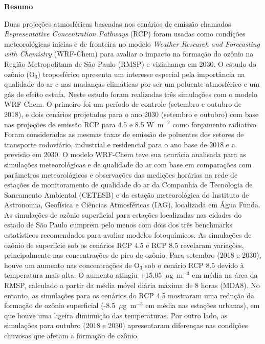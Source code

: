 \begin{spacing}{1.5}
		\begin{center}
			\LARGE \textbf{Resumo}\\[2cm]
		\end{center}
			Duas proje\c{c}\~{o}es atmosf\'{e}ricas baseadas nos cenários de emiss\~{a}o chamados \textit{Representative Concentration Pathways} (RCP) foram usadas como condições meteorol\'{o}gicas inicias e de fronteira no modelo \textit{Weather Research and Forecasting with Chemistry} (WRF-Chem) para avaliar o impacto na formação do ozônio na Região Metropolitana de São Paulo (RMSP) e vizinhança em 2030.
			O estudo do ozônio (O$_3$) troposférico apresenta um interesse especial pela importância na qualidade do ar e nas mudanças climáticas por ser um poluente atmosférico e um gás de efeito estufa.
			Neste estudo foram realizadas três simulações com o modelo WRF-Chem. O primeiro foi um período de controle (setembro e outubro de 2018), e dois cenários projetados para o ano 2030 (setembro e outubro) com base nas projeções de emissão RCP para 4.5 e 8.5 W~m$^{-2}$ como forçamento radiativo.	Foram consideradas as mesmas taxas de emissão de poluentes dos setores de transporte rodoviário, industrial e residencial para o ano base de 2018 e a previsão em 2030.
			O modelo WRF-Chem teve sua acurácia analisada para as simulações meteorológicas e de qualidade do ar com base em comparações com parâmetros meteorológicos e observações das medições horárias na rede de estações de monitoramento de qualidade do ar da Companhia de Tecnologia de Saneamento Ambiental (CETESB) e da estação meteorológica do Instituto de Astronomia, Geofísica e Ciências Atmosféricas (IAG), localizada em Água Funda.
			As simulações de ozônio superficial para estações localizadas nas cidades do estado de São Paulo cumprem pelo menos com dois dos três benchmarks estatísticos recomendados para avaliar modelos fotoquímicos. As simulações de ozônio de superfície sob os cenários RCP 4.5 e RCP 8.5 revelaram variações, principalmente nas concentrações de pico de ozônio. Para setembro (2018 e 2030), houve um aumento nas concentrações de O$_3$ sob o cenário RCP 8.5 devido à temperatura mais alta. O aumento atingiu +15.05~$\mu$g~m$^{-3}$ em média na área da RMSP, calculado a partir da média móvel diária máxima de 8 horas (MDA8). No entanto, as simulações para os cenários do RCP 4.5 mostraram uma redução da formação de ozônio superficial (-8.5~$\mu$g~m$^{-3}$ em média nas estações urbanas), em que houve uma ligeira diminuição das temperaturas. Por outro lado, as simulações para outubro (2018 e 2030) apresentaram diferenças nas condições chuvosas que afetam a formação de ozônio. 

\end{spacing}
